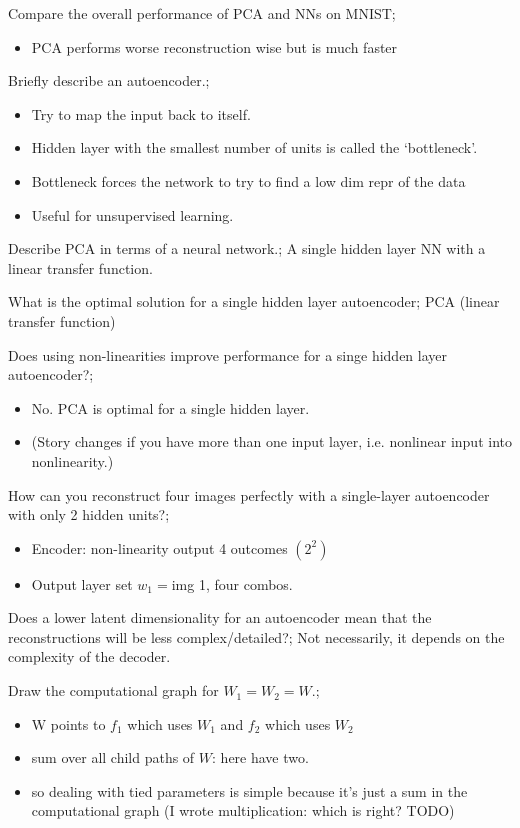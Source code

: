 \documentclass{article}
\begin{document}
Compare the overall performance of PCA and NNs on MNIST; \begin{itemize}
    \item PCA performs worse reconstruction wise but is much faster
\end{itemize}

Briefly describe an autoencoder.; \begin{itemize}
    \item Try to map the input back to itself.
    \item Hidden layer with the smallest number of units is called the `bottleneck'.
    \item Bottleneck forces the network to try to find a low dim repr of the data
    \item Useful for unsupervised learning.
\end{itemize}

Describe PCA in terms of a neural network.; A single hidden layer NN with a linear transfer function.

What is the optimal solution for a single hidden layer autoencoder; PCA (linear transfer function)

Does using non-linearities improve performance for a singe hidden layer autoencoder?; \begin{itemize}
    \item No. PCA is optimal for a single hidden layer. 
    \item (Story changes if you have more than one input layer, i.e. nonlinear input into nonlinearity.)
\end{itemize}

How can you reconstruct four images perfectly with a single-layer autoencoder with only 2 hidden units?; \begin{itemize}
    \item Encoder: non-linearity output 4 outcomes $(2^2)$
    \item Output layer set $w_1=$img 1, four combos.
\end{itemize}

Does a lower latent dimensionality for an autoencoder mean that the reconstructions will be less complex/detailed?; Not necessarily, it depends on the complexity of the decoder.

Draw the computational graph for $W_1 = W_2 = W$.; \begin{itemize}
    \item W points to $f_1$ which uses $W_1$ and $f_2$ which uses $W_2$
    \item sum over all child paths of $W$: here have two.
    \item so dealing with tied parameters is simple because it's just a sum in the computational graph (I wrote multiplication: which is right? TODO)
\end{itemize}
\end{document}
